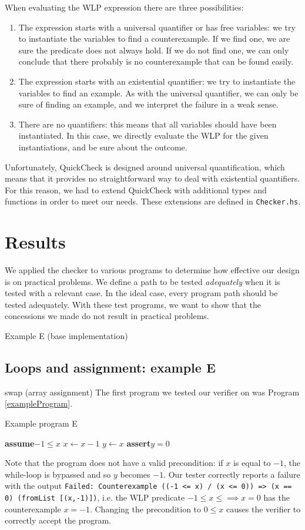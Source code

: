 \documentclass[a4paper]{article}
\newcommand{\Assert}{\State\textbf{assert}\xspace}
\newcommand{\Assume}{\State\textbf{assume}\xspace}
\begin{document}
When evaluating the WLP expression there are three possibilities:

\begin{enumerate}
\item The expression starts with a universal quantifier or has free variables:
we try to instantiate the variables to find a counterexample. If we find one, we
are sure the predicate does not always hold. If we do not find one, we can only
conclude that there probably is no counterexample that can be found easily.
\item The expression starts with an existential quantifier: we try to instantiate
the variables to find an example. As with the universal quantifier, we can only
be sure of finding an example, and we interpret the failure in a weak sense.
\item There are no quantifiers: this means that all variables should have been
instantiated. In this case, we directly evaluate the WLP for the given
instantiations, and be sure about the outcome.
\end{enumerate}

Unfortunately, QuickCheck is designed around universal quantification, which means
that it provides no straightforward way to deal with existential quantifiers.
For this reason, we had to extend QuickCheck with additional types and functions
in order to meet our needs. These extensions are defined in \texttt{Checker.hs}.

\section{Results}

We applied the checker to various programs to determine how effective our design is on practical problems. We define a path to be tested \emph{adequately} when it is tested with a relevant case. In the ideal case, every program path should be tested adequately. With these test programs, we want to show that the concessions we made do not result in practical problems.
\item Example E (base implementation)
\subsection{Loops and assignment: example E}
\item swap (array assignment)
The first program we tested our verifier on was Program \ref{exampleProgram}.
\begin{algorithm}\label{exampleProgram}
\caption{Example program E}
\begin{algorithmic}
\Assume $-1 \leq x$
	\State $x \gets x - 1$
\EndWhile
\State $y \gets x$
\Assert $y = 0$
\end{algorithmic}
\end{algorithm}
Note that the program does not have a valid precondition: if $x$ is equal to $-1$, the while-loop is bypassed and so $y$ becomes $-1$. Our tester correctly reports a failure with the output \texttt{Failed: Counterexample ((-1 <= x) /\ (x <= 0)) => (x == 0) (fromList [(x,-1)])}, i.e. the WLP predicate $-1 \leq x \leq \implies x = 0$ has the counterexample $x = -1$. Changing the precondition to $0 \leq x$ causes the verifier to correctly accept the program.
\end{document}
